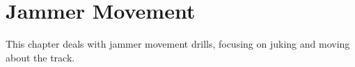 \chapter{Jammer Movement}

This chapter deals with jammer movement drills, focusing on juking and moving about the track. 

